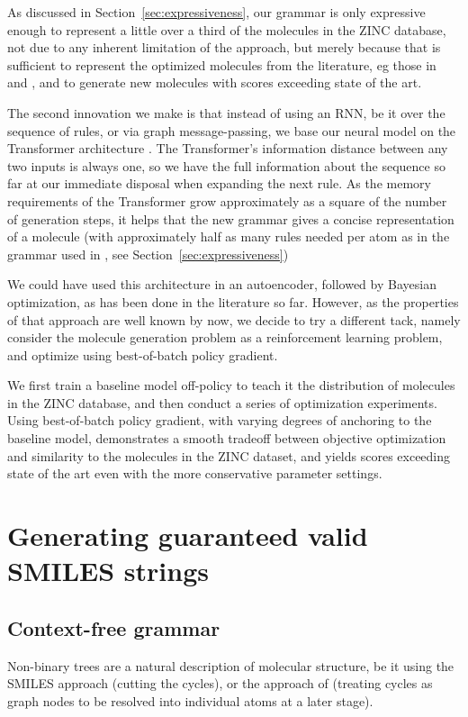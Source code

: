 \documentclass{article}
\begin{document}
As discussed in Section~\ref{sec:expressiveness}, our grammar is only expressive enough to represent a little over a third of the molecules in the ZINC database, not due to any inherent limitation of the approach, but merely because that is sufficient to represent the optimized molecules from the literature, eg those in \cite{kusner17} and \cite{jin18}, and to generate new molecules with scores exceeding state of the art. 
 
The second innovation we make is that instead of using an RNN, be it over the sequence of rules, or via graph message-passing, we base our neural model on the Transformer architecture \cite{Transformer17}. The Transformer's information distance between any two inputs is always one, so we have the full information about the sequence so far at our immediate disposal when expanding the next rule. As the memory requirements of the Transformer grow approximately as a square of the number of generation steps, it helps that the new grammar gives a concise representation of a molecule (with approximately half as many rules needed per atom as in the grammar used in \cite{kusner17}, see Section~\ref{sec:expressiveness})
 
 We could have used this architecture in an autoencoder, followed by Bayesian optimization, as has been done in the literature so far. However, as the properties of that approach are well known by now, we decide to try a different tack, namely consider the molecule generation problem as a reinforcement learning problem, and optimize using best-of-batch policy gradient. 
 
 We first train a baseline model off-policy to teach it the distribution of molecules in the ZINC database, and then conduct a series of optimization experiments. Using best-of-batch policy gradient, with varying degrees of anchoring to the baseline model, demonstrates a smooth tradeoff between objective optimization and similarity to the molecules in the ZINC dataset, and yields scores exceeding state of the art even with the more conservative parameter settings.

\section{Generating guaranteed valid SMILES strings}\label{sec:valid_smiles}

\subsection{Context-free grammar}
Non-binary trees are a natural description of molecular structure, be it using the SMILES approach (cutting the cycles), or the approach of \cite{jin18} (treating cycles as graph nodes to be resolved into individual atoms at a later stage).
\end{document}
